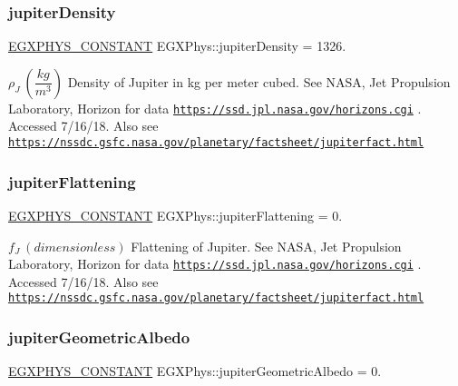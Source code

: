 \subsubsection{\texorpdfstring{jupiter\+Density}{jupiterDensity}}
{\footnotesize\ttfamily \mbox{\hyperlink{group___e_g_x_phys-_constants-_macros_ga76980d288494ce1714c9ac68a95ba702}{E\+G\+X\+P\+H\+Y\+S\+\_\+\+C\+O\+N\+S\+T\+A\+NT}} E\+G\+X\+Phys\+::jupiter\+Density = 1326.}

$\rho_{J} \ (\dfrac{kg}{m^3})$ Density of Jupiter in kg per meter cubed. See N\+A\+SA, Jet Propulsion Laboratory, Horizon for data \href{https://ssd.jpl.nasa.gov/horizons.cgi}{\tt https\+://ssd.\+jpl.\+nasa.\+gov/horizons.\+cgi} . Accessed 7/16/18. Also see \href{https://nssdc.gsfc.nasa.gov/planetary/factsheet/jupiterfact.html}{\tt https\+://nssdc.\+gsfc.\+nasa.\+gov/planetary/factsheet/jupiterfact.\+html} \mbox{\label{group___e_g_x_phys-_constants-_astrophysics-_solar_system-_jupiter-_bulk_gad468e6d4f1654ea8065a49a39302b039}} 
\subsubsection{\texorpdfstring{jupiter\+Flattening}{jupiterFlattening}}
{\footnotesize\ttfamily \mbox{\hyperlink{group___e_g_x_phys-_constants-_macros_ga76980d288494ce1714c9ac68a95ba702}{E\+G\+X\+P\+H\+Y\+S\+\_\+\+C\+O\+N\+S\+T\+A\+NT}} E\+G\+X\+Phys\+::jupiter\+Flattening = 0.}

$f_{J} \ (dimensionless)$ Flattening of Jupiter. See N\+A\+SA, Jet Propulsion Laboratory, Horizon for data \href{https://ssd.jpl.nasa.gov/horizons.cgi}{\tt https\+://ssd.\+jpl.\+nasa.\+gov/horizons.\+cgi} . Accessed 7/16/18. Also see \href{https://nssdc.gsfc.nasa.gov/planetary/factsheet/jupiterfact.html}{\tt https\+://nssdc.\+gsfc.\+nasa.\+gov/planetary/factsheet/jupiterfact.\+html} \mbox{\label{group___e_g_x_phys-_constants-_astrophysics-_solar_system-_jupiter-_bulk_ga8ca933493ff89584bc50b7e5bcbb64b2}} 
\subsubsection{\texorpdfstring{jupiter\+Geometric\+Albedo}{jupiterGeometricAlbedo}}
{\footnotesize\ttfamily \mbox{\hyperlink{group___e_g_x_phys-_constants-_macros_ga76980d288494ce1714c9ac68a95ba702}{E\+G\+X\+P\+H\+Y\+S\+\_\+\+C\+O\+N\+S\+T\+A\+NT}} E\+G\+X\+Phys\+::jupiter\+Geometric\+Albedo = 0.}

